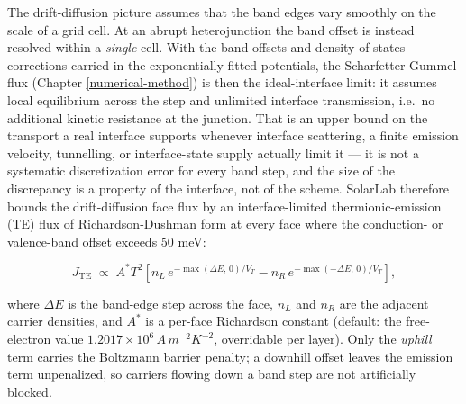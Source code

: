 \documentclass[
  11pt,
  american,
]{report}
\begin{document}
The drift-diffusion picture assumes that the band edges vary smoothly on
the scale of a grid cell. At an abrupt heterojunction the band offset is
instead resolved within a \emph{single} cell. With the band offsets and
density-of-states corrections carried in the exponentially fitted
potentials, the Scharfetter-Gummel flux (Chapter \ref{numerical-method})
is then the ideal-interface limit: it assumes local equilibrium across
the step and unlimited interface transmission, i.e.~no additional
kinetic resistance at the junction. That is an upper bound on the
transport a real interface supports whenever interface scattering, a
finite emission velocity, tunnelling, or interface-state supply actually
limit it --- it is not a systematic discretization error for every band
step, and the size of the discrepancy is a property of the interface,
not of the scheme. SolarLab therefore bounds the drift-diffusion face
flux by an interface-limited thermionic-emission (TE) flux of
Richardson-Dushman form at every face where the conduction- or
valence-band offset exceeds 50 meV:

\begin{equation}
\label{eq:te-flux}
J_{\mathrm{TE}}
\;\propto\;
A^{*}T^{2}
\left[
n_{L}\, e^{-\max(\Delta E,\,0)/V_T}
-
n_{R}\, e^{-\max(-\Delta E,\,0)/V_T}
\right],
\end{equation}

where \(\Delta E\) is the band-edge step across the face, \(n_L\) and
\(n_R\) are the adjacent carrier densities, and \(A^{*}\) is a per-face
Richardson constant (default: the free-electron value
\(1.2017\times10^{6}\,A\,m^{-2}K^{-2}\), overridable per layer). Only
the \emph{uphill} term carries the Boltzmann barrier penalty; a downhill
offset leaves the emission term unpenalized, so carriers flowing down a
band step are not artificially blocked.
\end{document}
